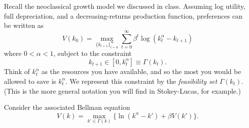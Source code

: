 \documentclass[11pt]{extarticle}
\theoremstyle{plain}
\theoremstyle{definition}
\begin{document}
Recall the neoclassical growth model we discussed in class. Assuming log utility, full depreciation, and a decreasing-returns production function, preferences can be written as
\begin{equation*}
	V(k_0) = \max_{ \{ k_{t+1} \}_{t=0}^\infty} \sum_{t=0}^\infty \beta^t \log (k_t^\alpha - k_{t+1})
\end{equation*}
where $0 < \alpha < 1$, subject to the constraint
\begin{equation*}
	k_{t+1} \in [0, k_t^\alpha] \equiv \Gamma(k_t).
\end{equation*}
Think of $k_t^\alpha$ as the resources you have available, and so the most you would be allowed to save is $k_t^\alpha$. We represent this constraint by the \textit{feasibility set} $\Gamma(k_t)$. (This is the more general notation you will find in Stokey-Lucas, for example.)

Consider the associated Bellman equation 
\begin{equation*}
	V(k) = \max_{k' \in \Gamma(k)} \bigg\{ \ln (k^\alpha - k') + \beta V(k') \bigg\}.
\end{equation*}
\end{document}
